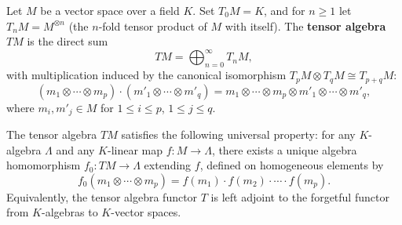 Let $M$ be a vector space over a field $K$. Set $T_0 M = K$, and for $n \geq 1$ let $T_n M = M^{\otimes n}$ (the $n$-fold tensor product of $M$ with itself). The \textbf{tensor algebra} $TM$ is the direct sum
$$
TM = \bigoplus_{n=0}^{\infty} T_n M,
$$
with multiplication induced by the canonical isomorphism $T_p M \otimes T_q M \cong T_{p+q} M$:
$$
(m_1 \otimes \cdots \otimes m_p) \cdot (m'_1 \otimes \cdots \otimes m'_q) = m_1 \otimes \cdots \otimes m_p \otimes m'_1 \otimes \cdots \otimes m'_q,
$$
where $m_i, m'_j \in M$ for $1 \leq i \leq p$, $1 \leq j \leq q$.

The tensor algebra $TM$ satisfies the following universal property: for any $K$-algebra $\Lambda$ and any $K$-linear map $f : M \to \Lambda$, there exists a unique algebra homomorphism $f_0 : TM \to \Lambda$ extending $f$, defined on homogeneous elements by
$$
f_0(m_1 \otimes \cdots \otimes m_p) = f(m_1) \cdot f(m_2) \cdot \cdots \cdot f(m_p).
$$
Equivalently, the tensor algebra functor $T$ is left adjoint to the forgetful functor from $K$-algebras to $K$-vector spaces.
